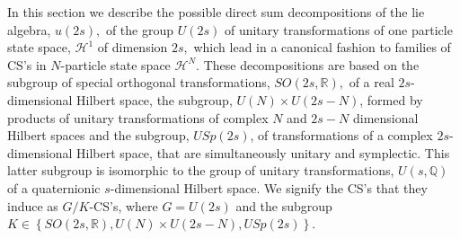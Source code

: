 \documentclass[aps,preprint]{revtex4}%
\begin{document}
In this section we describe the possible direct sum decompositions of the lie
algebra, $u(2s),$ of the group $U(2s)$ of unitary transformations of one
particle state space, $\mathcal{H}^{1}$ of dimension $2s,$ which lead in a
canonical fashion to families of CS's in $N$-particle state space
$\mathcal{H}^{N}$. These decompositions are based on the subgroup of special
orthogonal transformations, $SO\left(  2s,\mathbb{R}\right)  ,$ of a real
$2s$-dimensional Hilbert space, the subgroup, $U\left(  N\right)  \times
U\left(  2s-N\right)  $, formed by products of unitary transformations of
complex $N$ and $2s-N$ dimensional Hilbert spaces and the subgroup,
$USp\left(  2s\right)  $, of transformations of a complex $2s$-dimensional
Hilbert space, that are simultaneously unitary and symplectic. This latter
subgroup is isomorphic to the group of unitary transformations, $U\left(
s,\mathbb{Q}\right)  $ of a quaternionic $s$-dimensional Hilbert space. We
signify the CS's that they induce as $G/K$-CS's, where $G=U\left(  2s\right)
$ and the subgroup $K\in\left\{  SO\left(  2s,\mathbb{R}\right)  ,U\left(
N\right)  \times U\left(  2s-N\right)  ,USp\left(  2s\right)  \right\}  $.
\end{document}

